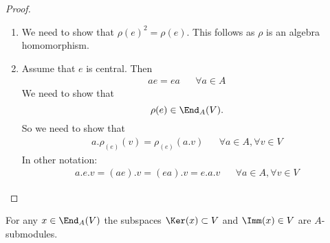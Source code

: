 \begin{proof}

\begin{enumerate}
  \item We need to show that \(\rho (e)^2=\rho (e)\). This follows as \(\rho \) is an algebra homomorphism.
  \item Assume that \(e\) is central. Then
\begin{align*}
ae=ea &&\forall a\in A
\end{align*}
We need to show that
\[
\rho (e) \in \End_A(V).
\]
So we need to show that
\begin{align*}
a.\rho _{(e)}(v)=\rho _{(e)}(a.v) &&\forall a\in A,\forall v\in V
\end{align*}
In other notation:
\begin{align*}
a.e.v=(ae).v=(ea).v=e.a.v &&\forall a\in A,\forall v\in V
\end{align*}
\end{enumerate}

\end{proof}

\begin{prop}
For any \(x\in \End_A(V)\) the subspaces \(\Ker(x)\subset V\) and \(\Imm(x)\in V\) are \(A\)-submodules.
\end{prop}

